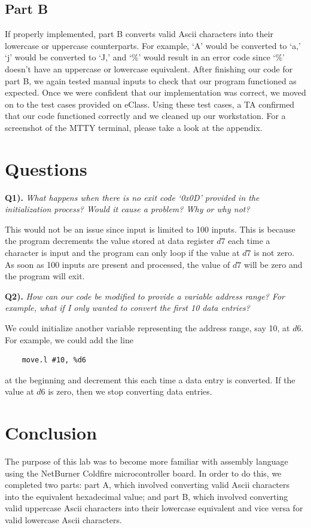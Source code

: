 \documentclass[10pt, letterpaper, titlepage]{article} %
\begin{document}
\begin{multicols*}{2}
\subsection{Part B}
If properly implemented, part B converts valid Ascii characters into their lowercase or uppercase counterparts. 
For example, `A' would be converted to `a,' `j' would be converted to `J,' and `\%' would result in an error code since `\%' doesn't have an uppercase or lowercase equivalent. 
After finishing our code for part B, we again tested manual inputs to check that our program functioned as expected.
Once we were confident that our implementation was correct, we moved on to the test cases provided on eClass.
Using these test cases, a TA confirmed that our code functioned correctly and we cleaned up our workstation.
For a screenshot of the MTTY terminal, please take a look at the appendix.


\section{Questions}
\textbf{Q1).} \textit{What happens when there is no exit code `0x0D' provided in the initialization process? Would it cause a problem? Why or why not?}

This would not be an issue since input is limited to 100 inputs. 
This is because the program decrements the value stored at data register $d7$ each time a character is input and the program can only loop if the value at $d7$ is not zero. 
As soon as 100 inputs are present and processed, the value of $d7$ will be zero and the program will exit.

\textbf{Q2).} \textit{How can our code be modified to provide a variable address range? For example, what if I only wanted to convert the first 10 data entries?}

We could initialize another variable representing the address range, say 10, at $d6$. 
For example, we could add the line
\begin{lstlisting}
	move.l #10, %d6
\end{lstlisting}
at the beginning and decrement this each time a data entry is converted. 
If the value at $d6$ is zero, then we stop converting data entries.

\section{Conclusion}
The purpose of this lab was to become more familiar with assembly language using the NetBurner Coldfire microcontroller board.  
In order to do this, we completed two parts: part A, which involved converting valid Ascii characters into the equivalent hexadecimal value; and part B, which involved converting valid uppercase Ascii characters into their lowercase equivalent and vice versa for valid lowercase Ascii characters.


\end{multicols*}
\end{document}
